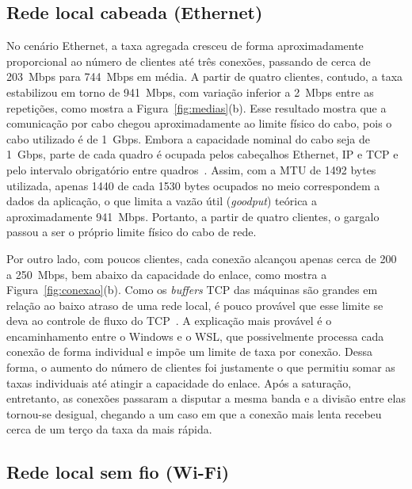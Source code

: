 \documentclass[12pt]{article}
\begin{document}
\newpage

\subsection{Rede local cabeada (Ethernet)}

No cenário Ethernet, a taxa agregada cresceu de forma aproximadamente proporcional
ao número de clientes até três conexões, passando de cerca de 203~Mbps para
744~Mbps em média. A partir de quatro clientes, contudo, a taxa estabilizou em
torno de 941~Mbps, com variação inferior a 2~Mbps entre as repetições, como
mostra a Figura~\ref{fig:medias}(b). Esse resultado mostra que a comunicação
por cabo chegou aproximadamente ao limite físico do cabo, pois o cabo utilizado
é de 1~Gbps. Embora a capacidade nominal do cabo seja de 1~Gbps, parte de cada
quadro é ocupada pelos cabeçalhos Ethernet, IP e TCP e pelo intervalo
obrigatório entre quadros~\cite{tanenbaum:21,kurose:21}. Assim, com a MTU de 1492 bytes utilizada, apenas
1440 de cada 1530 bytes ocupados no meio correspondem a dados da aplicação, o
que limita a vazão útil (\textit{goodput}) teórica a aproximadamente 941~Mbps.
Portanto, a partir de quatro clientes, o gargalo passou a ser o próprio limite
físico do cabo de rede.

Por outro lado, com poucos clientes, cada conexão alcançou apenas cerca de 200
a 250~Mbps, bem abaixo da capacidade do enlace, como mostra a
Figura~\ref{fig:conexao}(b). Como os \textit{buffers} TCP
das máquinas são grandes em relação ao baixo atraso de uma rede local, é pouco
provável que esse limite se deva ao controle de fluxo do TCP~\cite{rfc9293}. A explicação mais
provável é o encaminhamento entre o Windows e o WSL, que possivelmente processa
cada conexão de forma individual e impõe um limite de taxa por conexão. Dessa
forma, o aumento do número de clientes foi justamente o que permitiu somar as
taxas individuais até atingir a capacidade do enlace. Após a saturação,
entretanto, as conexões passaram a disputar a mesma banda e a divisão entre
elas tornou-se desigual, chegando a um caso em que a conexão mais lenta recebeu
cerca de um terço da taxa da mais rápida.

\subsection{Rede local sem fio (Wi-Fi)}
\end{document}
